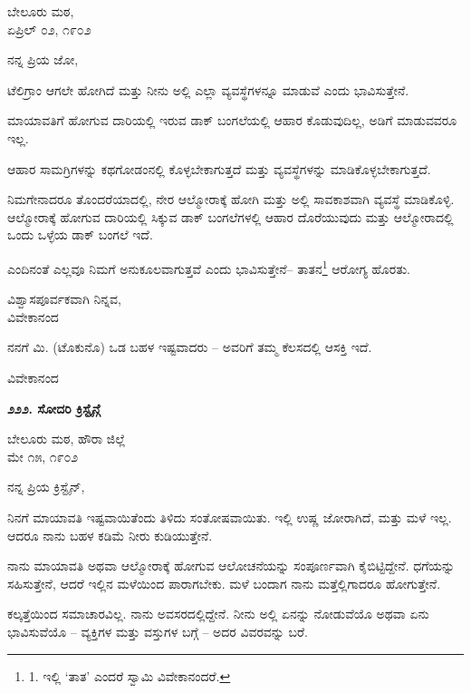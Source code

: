 \begin{flushright}
ಬೇಲೂರು ಮಠ,\\ಏಪ್ರಿಲ್ ೦೨, ೧೯೦೨
\end{flushright}

ನನ್ನ ಪ್ರಿಯ ಜೋ,

ಟೆಲಿಗ್ರಾಂ ಆಗಲೇ ಹೋಗಿದೆ ಮತ್ತು ನೀನು ಅಲ್ಲಿ ಎಲ್ಲಾ ವ್ಯವಸ್ಥೆಗಳನ್ನೂ ಮಾಡುವೆ ಎಂದು ಭಾವಿಸುತ್ತೇನೆ.

ಮಾಯಾವತಿಗೆ ಹೋಗುವ ದಾರಿಯಲ್ಲಿ ಇರುವ ಡಾಕ್ ಬಂಗಲೆಯಲ್ಲಿ ಆಹಾರ ಕೊಡುವುದಿಲ್ಲ, ಅಡಿಗೆ ಮಾಡುವವರೂ ಇಲ್ಲ.

ಆಹಾರ ಸಾಮಗ್ರಿಗಳನ್ನು ಕಥಗೋಡಂನಲ್ಲಿ ಕೊಳ್ಳಬೇಕಾಗುತ್ತದೆ ಮತ್ತು ವ್ಯವಸ್ಥೆಗಳನ್ನು ಮಾಡಿಕೊಳ್ಳಬೇಕಾಗುತ್ತದೆ.

ನಿಮಗೇನಾದರೂ ತೊಂದರೆಯಾದಲ್ಲಿ, ನೇರ ಆಲ್ಮೋರಾಕ್ಕೆ ಹೋಗಿ ಮತ್ತು ಅಲ್ಲಿ ಸಾವಕಾಶವಾಗಿ ವ್ಯವಸ್ಥೆ ಮಾಡಿಕೊಳ್ಳಿ. ಆಲ್ಮೋರಾಕ್ಕೆ ಹೋಗುವ ದಾರಿಯಲ್ಲಿ ಸಿಕ್ಕುವ ಡಾಕ್ ಬಂಗಲೆಗಳಲ್ಲಿ ಆಹಾರ ದೊರೆಯುವುದು ಮತ್ತು ಆಲ್ಮೋರಾದಲ್ಲಿ ಒಂದು ಒಳ್ಳೆಯ ಡಾಕ್ ಬಂಗಲೆ ಇದೆ.

ಎಂದಿನಂತೆ ಎಲ್ಲವೂ ನಿಮಗೆ ಅನುಕೂಲವಾಗುತ್ತವೆ ಎಂದು ಭಾವಿಸುತ್ತೇನೆ– ತಾತನ\footnote{1. ಇಲ್ಲಿ ‘ತಾತ’ ಎಂದರೆ ಸ್ವಾಮಿ ವಿವೇಕಾನಂದರೆ.} ಆರೋಗ್ಯ ಹೊರತು.

\begin{flushright}
ವಿಶ್ವಾಸಪೂರ್ವಕವಾಗಿ ನಿನ್ನವ,\\ವಿವೇಕಾನಂದ
\end{flushright}

ನನಗೆ ಮಿ. (ಟೊಕುನೊ) ಒಡ ಬಹಳ ಇಷ್ಟವಾದರು – ಅವರಿಗೆ ತಮ್ಮ ಕೆಲಸದಲ್ಲಿ ಆಸಕ್ತಿ ಇದೆ.

\begin{flushright}
ವಿವೇಕಾನಂದ
\end{flushright}

\begin{center}
\textbf{೨೨೨. ಸೋದರಿ ಕ್ರಿಸ್ಟೈನ್ಗೆ}
\end{center}

\begin{flushright}
ಬೇಲೂರು ಮಠ, ಹೌರಾ ಜಿಲ್ಲೆ\\ಮೇ ೧೫, ೧೯೦೨
\end{flushright}

ನನ್ನ ಪ್ರಿಯ ಕ್ರಿಸ್ಟೈನ್,

ನಿನಗೆ ಮಾಯಾವತಿ ಇಷ್ಟವಾಯಿತೆಂದು ತಿಳಿದು ಸಂತೋಷವಾಯಿತು. ಇಲ್ಲಿ ಉಷ್ಣ ಜೋರಾಗಿದೆ, ಮತ್ತು ಮಳೆ ಇಲ್ಲ. ಆದರೂ ನಾನು ಬಹಳ ಕಡಿಮೆ ನೀರು ಕುಡಿಯುತ್ತೇನೆ.

ನಾನು ಮಾಯಾವತಿ ಅಥವಾ ಆಲ್ಮೋರಾಕ್ಕೆ ಹೋಗುವ ಆಲೋಚನೆಯನ್ನು ಸಂಪೂರ್ಣವಾಗಿ ಕೈಬಿಟ್ಟಿದ್ದೇನೆ. ಧಗೆಯನ್ನು ಸಹಿಸುತ್ತೇನೆ, ಆದರೆ ಇಲ್ಲಿನ ಮಳೆಯಿಂದ ಪಾರಾಗಬೇಕು. ಮಳೆ ಬಂದಾಗ ನಾನು ಮತ್ತೆಲ್ಲಿಗಾದರೂ ಹೋಗುತ್ತೇನೆ.

ಕಲ್ಕತ್ತೆಯಿಂದ ಸಮಾಚಾರವಿಲ್ಲ. ನಾನು ಅವಸರದಲ್ಲಿದ್ದೇನೆ. ನೀನು ಅಲ್ಲಿ ಏನನ್ನು ನೋಡುವೆಯೊ ಅಥವಾ ಏನು ಭಾವಿಸುವೆಯೊ – ವ್ಯಕ್ತಿಗಳ ಮತ್ತು ವಸ್ತುಗಳ ಬಗ್ಗೆ – ಅದರ ವಿವರವನ್ನು ಬರೆ.

